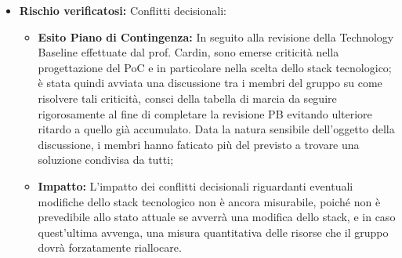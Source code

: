 \begin{itemize}
    \item \textbf{Rischio verificatosi:} Conflitti decisionali:
    \begin{itemize}
        \item \textbf{Esito Piano di Contingenza:} In seguito alla revisione della Technology Baseline effettuate dal prof. Cardin, sono emerse criticità nella progettazione del PoC e in particolare nella scelta dello stack tecnologico; è stata quindi avviata una discussione tra i membri del gruppo su come risolvere tali criticità, consci della tabella di marcia da seguire rigorosamente al fine di completare la revisione PB evitando ulteriore ritardo a quello già accumulato. Data la natura sensibile dell'oggetto della discussione, i membri hanno faticato più del previsto a trovare una soluzione condivisa da tutti;
        \item \textbf{Impatto:} L'impatto dei conflitti decisionali riguardanti eventuali modifiche dello stack tecnologico non è ancora misurabile, poiché non è prevedibile allo stato attuale se avverrà una modifica dello stack, e in caso quest'ultima avvenga, una misura quantitativa delle risorse che il gruppo dovrà forzatamente riallocare.
    \end{itemize}
\end{itemize}


